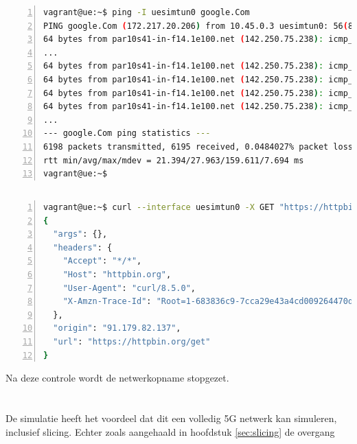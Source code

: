 \begin{lstlisting}[basicstyle=\small, frame=single, breaklines=true, postbreak=\mbox{\textcolor{red}{$\hookrightarrow$}\space}, escapeinside ={\%,}, escapechar={!}, numbers=left, language=sh, caption=Test - Ping]
    vagrant@ue:~$ ping -I uesimtun0 google.Com
PING google.Com (172.217.20.206) from 10.45.0.3 uesimtun0: 56(84) bytes of data.
64 bytes from par10s41-in-f14.1e100.net (142.250.75.238): icmp_seq=6182 ttl=116 time=25.1 ms
...
64 bytes from par10s41-in-f14.1e100.net (142.250.75.238): icmp_seq=6183 ttl=116 time=41.6 ms
64 bytes from par10s41-in-f14.1e100.net (142.250.75.238): icmp_seq=6184 ttl=116 time=30.3 ms
64 bytes from par10s41-in-f14.1e100.net (142.250.75.238): icmp_seq=6185 ttl=116 time=38.5 ms
64 bytes from par10s41-in-f14.1e100.net (142.250.75.238): icmp_seq=6186 ttl=116 time=23.5 ms
...
--- google.Com ping statistics ---
6198 packets transmitted, 6195 received, 0.0484027% packet loss, time 6231019ms
rtt min/avg/max/mdev = 21.394/27.963/159.611/7.694 ms
vagrant@ue:~$
\end{lstlisting}

\subsection{}%
\label{sec:Test-curl}%


\begin{lstlisting}[basicstyle=\small, frame=single, breaklines=true, postbreak=\mbox{\textcolor{red}{$\hookrightarrow$}\space}, escapeinside ={\%,}, escapechar={!}, numbers=left, language=sh, caption=Test - Curl]
vagrant@ue:~$ curl --interface uesimtun0 -X GET "https://httpbin.org/get"
{
  "args": {},
  "headers": {
    "Accept": "*/*",
    "Host": "httpbin.org",
    "User-Agent": "curl/8.5.0",
    "X-Amzn-Trace-Id": "Root=1-683836c9-7cca29e43a4cd009264470d9"
  },
  "origin": "91.179.82.137",
  "url": "https://httpbin.org/get"
}
\end{lstlisting}

Na deze controle wordt de netwerkopname stopgezet.

\section{}%
\label{sec:integrations}%

De simulatie heeft het voordeel dat dit een volledig 5G netwerk kan simuleren, inclusief slicing. Echter zoals aangehaald in hoofdstuk \ref{sec:slicing} de overgang 

